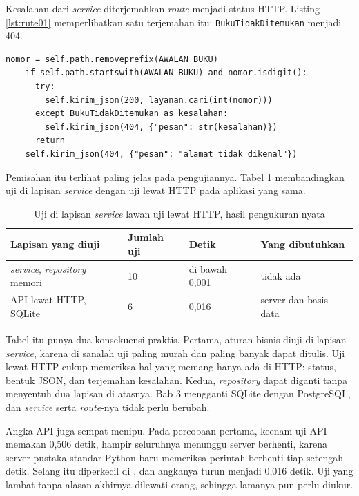 Kesalahan dari \textit{service} diterjemahkan \textit{route} menjadi status
HTTP. Listing \ref{lst:rute01} memperlihatkan satu terjemahan itu:
\texttt{BukuTidakDitemukan} menjadi 404.

\begin{lstlisting}[style=PythonStyle, caption={\textit{Route} menerjemahkan kesalahan menjadi status HTTP, tersedia di \berkas{sources/chapter01/rute.py}}, label={lst:rute01}]
    nomor = self.path.removeprefix(AWALAN_BUKU)
    if self.path.startswith(AWALAN_BUKU) and nomor.isdigit():
      try:
        self.kirim_json(200, layanan.cari(int(nomor)))
      except BukuTidakDitemukan as kesalahan:
        self.kirim_json(404, {"pesan": str(kesalahan)})
      return
    self.kirim_json(404, {"pesan": "alamat tidak dikenal"})
\end{lstlisting}

Pemisahan itu terlihat paling jelas pada pengujiannya. Tabel
\ref{tab:uji01} membandingkan uji di lapisan \textit{service} dengan uji
lewat HTTP pada aplikasi yang sama.

\begin{table}[!htb]
  \centering
  \caption{Uji di lapisan \textit{service} lawan uji lewat HTTP, hasil
           pengukuran nyata}
  \label{tab:uji01}
  \begin{tabularx}{\textwidth}{Xlll}
    \hline
    \textbf{Lapisan yang diuji} & \textbf{Jumlah uji} & \textbf{Detik} & \textbf{Yang dibutuhkan} \\
    \hline
    \textit{service}, \textit{repository} memori & 10 & di bawah 0,001 & tidak ada \\
    \hline
    API lewat HTTP, SQLite & 6 & 0,016 & server dan basis data \\
    \hline
  \end{tabularx}
\end{table}

Tabel itu punya dua konsekuensi praktis. Pertama, aturan bisnis diuji di
lapisan \textit{service}, karena di sanalah uji paling murah dan paling banyak
dapat ditulis. Uji lewat HTTP cukup memeriksa hal yang memang hanya ada di
HTTP: status, bentuk JSON, dan terjemahan
kesalahan. Kedua, \textit{repository} dapat diganti tanpa menyentuh dua
lapisan di atasnya. Bab 3 mengganti SQLite dengan PostgreSQL, dan
\textit{service} serta \textit{route}-nya tidak perlu berubah.

Angka API juga sempat menipu. Pada percobaan pertama, keenam uji API memakan
0,506 detik, hampir seluruhnya menunggu server berhenti, karena server
pustaka standar Python baru memeriksa perintah berhenti tiap setengah detik.
Selang itu diperkecil di , dan angkanya turun menjadi
0,016 detik. Uji yang lambat tanpa alasan akhirnya dilewati orang, sehingga
lamanya pun perlu diukur.

